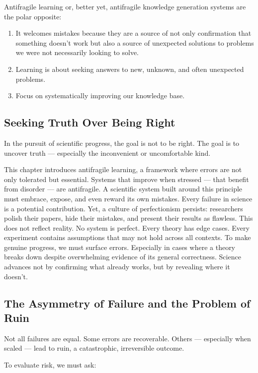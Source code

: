 Antifragile learning or, better yet, antifragile knowledge generation systems are the polar opposite:
\begin{enumerate}
	\item It welcomes mistakes because they are a source of not only confirmation that something doesn't work but also a source of unexpected solutions to problems we were not necessarily looking to solve.
	\item Learning is about seeking answers to new, unknown, and often unexpected problems.
	\item Focus on systematically improving our knowledge base.
\end{enumerate}


\subsection{Seeking Truth Over Being Right}

In the pursuit of scientific progress, the goal is not to be right. The goal is to uncover truth — especially the inconvenient or uncomfortable kind.

This chapter introduces antifragile learning, a framework where errors are not only tolerated but essential. Systems that improve when stressed — that benefit from disorder — are antifragile. A scientific system built around this principle must embrace, expose, and even reward its own mistakes. Every failure in science is a potential contribution. Yet, a culture of perfectionism persists: researchers polish their papers, hide their mistakes, and present their results as flawless. This does not reflect reality. No system is perfect. Every theory has edge cases. Every experiment contains assumptions that may not hold across all contexts. To make genuine progress, we must surface errors. Especially in cases where a theory breaks down despite overwhelming evidence of its general correctness. Science advances not by confirming what already works, but by revealing where it doesn't.

\subsection{The Asymmetry of Failure and the Problem of Ruin}

Not all failures are equal. Some errors are recoverable. Others — especially when scaled — lead to ruin, a catastrophic, irreversible outcome.

To evaluate risk, we must ask:

